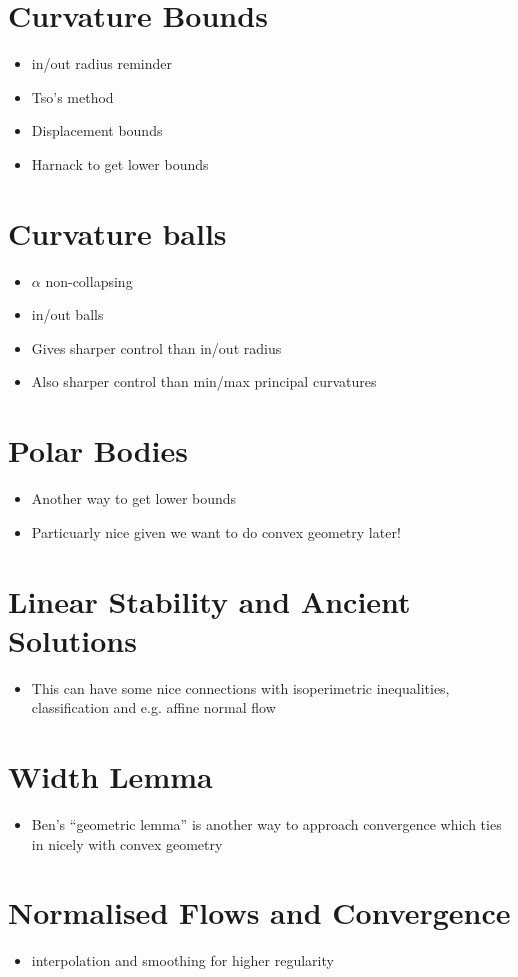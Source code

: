 \section{Curvature Bounds}

\begin{itemize}
\item in/out radius reminder
\item Tso's method
\item Displacement bounds
\item Harnack to get lower bounds
\end{itemize}

\section{Curvature balls}

\begin{itemize}
\item \(\alpha\) non-collapsing
\item in/out balls
\item Gives sharper control than in/out radius
\item Also sharper control than min/max principal curvatures
\end{itemize}

\section{Polar Bodies}

\begin{itemize}
\item Another way to get lower bounds
\item Particuarly nice given we want to do convex geometry later!
\end{itemize}

\section{Linear Stability and Ancient Solutions}

\begin{itemize}
\item This can have some nice connections with isoperimetric inequalities, classification and e.g. affine normal flow
\end{itemize}

\section{Width Lemma}

\begin{itemize}
\item Ben's ``geometric lemma'' is another way to approach convergence which ties in nicely with convex geometry
\end{itemize}

\section{Normalised Flows and Convergence}

\begin{itemize}
\item interpolation and smoothing for higher regularity
\end{itemize}